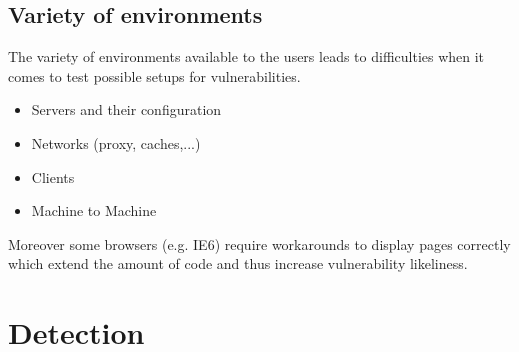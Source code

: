 \subsection{Variety of environments}
The variety of environments available to the users leads to
difficulties when it comes to test possible setups for
vulnerabilities.\\
\begin{itemize}
\item Servers and their configuration
\item Networks (proxy, caches,...)
\item Clients
\item Machine to Machine
\end{itemize}
Moreover some browsers (e.g. IE6) require workarounds to
display pages correctly which extend the amount of code and thus
increase vulnerability likeliness.

\section{Detection}
